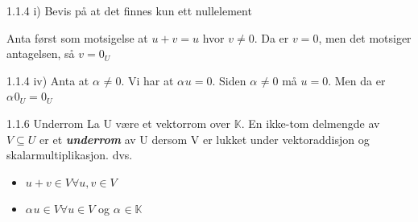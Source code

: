 \documentclass[a4paper,norsk]{article}
\begin{document}
\begin{proofbox}{1.1.4 i)}{}
Bevis på at det finnes kun ett nullelement

Anta først som motsigelse at $ u + v = u $ hvor  $ v \neq 0 $. Da er $ v = 0 $, men det motsiger antagelsen, så $ v = 0_U $  
\end{proofbox}

\begin{proofbox}{1.1.4 iv)}{}
Anta at $ \alpha_{}^{} \neq 0 $. Vi har at $ \alpha_{}^{} u = 0 $. Siden $ \alpha_{}^{} \neq 0 $ må $ u = 0 $. Men da er $ \alpha_{}^{} 0_U = 0_U $    
\end{proofbox}

\begin{definitionbox}{1.1.6 Underrom}{}
La U være et vektorrom over $ \mathbb{K} $. En ikke-tom delmengde av $ V \subseteq U $ er et \textbf{\textit{underrom}} av U dersom V er lukket under vektoraddisjon og skalarmultiplikasjon. dvs.
\begin{itemize}
    \item $ u + v \in V \forall u, v \in V $ 
    \item $ \alpha_{}^{} u \in V \forall u \in V  $ og $ \alpha_{}^{} \in  \mathbb{K} $  
\end{itemize}
\end{definitionbox}
\end{document}
